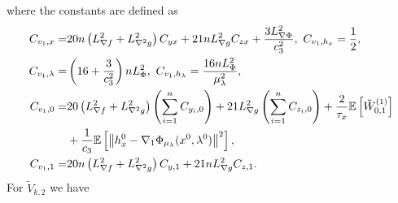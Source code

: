 \documentclass[10pt]{article}
\theoremstyle{remark}
\newcommand{\E}{\mathbb{E}}
\newcommand{\norm}[1]{\left\|#1\right\|}
\begin{document}
where the constants are defined as
\begin{align}
    C_{v_1, x} = &20n\left(L_{\nabla f}^2 + L_{\nabla^2 g}^2\right)C_{yx} + 21nL_{\nabla g}^2C_{zx}  + \frac{3L_{\nabla \Phi}^2}{c_3^2},\ C_{v_1, h_x} = \frac{1}{2}, \notag \\
    C_{v_1, \lambda} = &\left(16+\frac{3}{c_3^2}\right)nL_{\Phi}^2,\ C_{v_1, h_{\lambda}} = \frac{16nL_{\Phi}^2}{\mu_{\lambda}^2}, \notag \\
    C_{v_1, 0} = &20\left(L_{\nabla f}^2 + L_{\nabla^2 g}^2\right)\left(\sum_{i=1}^{n}C_{y_i, 0}\right) + 21L_{\nabla g}^2\left(\sum_{i=1}^{n}C_{z_i, 0}\right)  + \frac{2}{\tau_x}\E\left[\tilde W_{0,1}^{(1)}\right] \notag \\
    &+ \frac{1}{c_3}\E\left[\norm{h_x^0 - \nabla_1\Phi_{\mu_{\lambda}}(x^0, \lambda^0)}^2\right], \notag \\
    C_{v_1, 1} = &20n\left(L_{\nabla f}^2 + L_{\nabla^2 g}^2\right)C_{y,1} + 21nL_{\nabla g}^2C_{z,1}. \notag 
\end{align}
For $\tilde V_{k,2}$ we have
\end{document}
